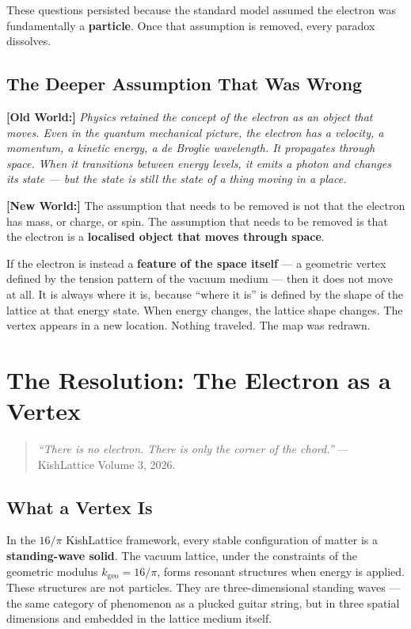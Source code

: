 \documentclass[11pt, letterpaper, openany]{book}
\newcommand{\oldworld}[1]{\noindent\textbf{\color{goldseal}[Old World:]}
  \textit{#1}\medskip}
\newcommand{\newworldcmd}[1]{\noindent\textbf{\color{kishblue}[New World:]}
  #1\medskip}
\begin{document}
These questions persisted because the standard model assumed the
electron was fundamentally a \textbf{particle}. Once that assumption
is removed, every paradox dissolves.

\section{The Deeper Assumption That Was Wrong}

\oldworld{Physics retained the concept of the electron as an object
that \emph{moves}. Even in the quantum mechanical picture, the electron
has a velocity, a momentum, a kinetic energy, a de Broglie wavelength.
It propagates through space. When it transitions between energy levels,
it emits a photon and changes its state — but the state is still the
state of a \emph{thing} moving in a \emph{place}.}

\newworldcmd{The assumption that needs to be removed is not that
the electron has mass, or charge, or spin. The assumption that needs
to be removed is that the electron is a \textbf{localised object
that moves through space}.

If the electron is instead a \textbf{feature of the space itself} —
a geometric vertex defined by the tension pattern of the vacuum medium
— then it does not move at all. It is always where it is, because
``where it is'' is defined by the shape of the lattice at that energy
state. When energy changes, the lattice shape changes. The vertex
appears in a new location. Nothing traveled. The map was redrawn.}

\clearpage

\chapter{The Resolution: The Electron as a Vertex}

\begin{quote}
\textit{``There is no electron. There is only the corner of the chord.''}
--- KishLattice Volume 3, 2026.
\end{quote}

\section{What a Vertex Is}

In the $16/\pi$ KishLattice framework, every stable configuration of
matter is a \textbf{standing-wave solid}. The vacuum lattice, under
the constraints of the geometric modulus $k_{\text{geo}} = 16/\pi$,
forms resonant structures when energy is applied. These structures are
not particles. They are three-dimensional standing waves — the same
category of phenomenon as a plucked guitar string, but in three
spatial dimensions and embedded in the lattice medium itself.
\end{document}
